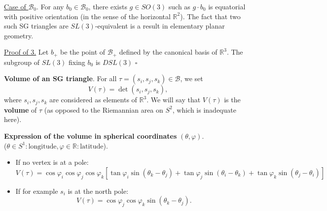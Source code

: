 \documentclass[12pt]{article}
\begin{document}
\underline{Case of $\mathcal{B}_0$}. For any $b_0 \in \mathcal{B}_0$, there exists $g \in SO(3)$ such as $g \cdot b_0$ is equatorial with positive orientation (in the sense of the horizontal $\mathbb{R}^2$). The fact that two such SG triangles are \newline $SL(3)$-equivalent is a result in elementary planar geometry.

\underline{Proof of 3.} Let $b_+$ be the point of $\mathcal{B}_+$ defined by the canonical basis of $\mathbb{R}^3$. The subgroup of $SL(3)$ fixing $b_0$ is $DSL(3)$ \hfill $\square$


    
     
     
     

\bigskip







\noindent \textbf{Volume of an SG triangle}. For all $\tau = (s_i, s_j, s_k) \in \mathcal{B}$, we set
\begin{equation*}
V(\tau) = \det(s_i, s_j, s_k),
\end{equation*}
where $s_i, s_j, s_k$ are considered as elements of $\mathbb{R}^3$. We will say that $V(\tau)$ is
the \textbf{volume} of $\tau$ (as opposed to the Riemannian area on $S^2$, which is inadequate
here).

\vspace{0.5cm}

\noindent \textbf{Expression of the volume in spherical coordinates} $(\theta, \varphi)$. \\
($\theta \in S^1 : \text{longitude}, \varphi \in \mathbb{R} : \text{latitude}$).
\begin{itemize}
\item If no vertex is at a pole:
\begin{equation*}
V(\tau) = \cos\varphi_i \cos\varphi_j \cos\varphi_k \left[ \tan\varphi_i \sin(\theta_k -
\theta_j) + \tan\varphi_j \sin(\theta_i - \theta_k) + \tan\varphi_k \sin(\theta_j - \theta_i) \right]
\end{equation*}
\item If for example $s_i$ is at the north pole:
\begin{equation*}
V(\tau) = \cos\varphi_j \cos\varphi_k \sin(\theta_k - \theta_j).
\end{equation*}
\end{itemize}

\vspace{0.5cm}
\end{document}
